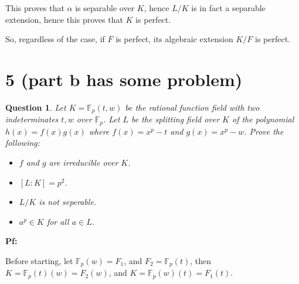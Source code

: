 \documentclass{article}
\newtheorem{question}{Question}
\begin{document}
This proves that $\alpha$ is separable over $K$, hence $L/K$ is in fact a separable extension, hence this proves that $K$ is perfect.

\hfil

So, regardless of the case, if $F$ is perfect, its algebraic extension $K/F$ is perfect.

\break

\section*{5 (part b has some problem)}
\begin{myBox}[]{}
    \begin{question}
        Let $K=\mathbb{F}_p(t,w)$ be the rational function field with two indeterminates $t,w$ over $\mathbb{F}_p$. Let $L$ be the splitting field over $K$ of the polynomial $h(x)=f(x)g(x)$ where $f(x)=x^p-t$ and $g(x)=x^p-w$. Prove the following:
        \begin{itemize}
            \item[(a)] $f$ and $g$ are irreducible over $K$.
            \item[(b)] $[L:K]=p^2$.
            \item[(c)] $L/K$ is not seperable.
            \item[(d)] $a^p\in K$ for all $a\in L$.
        \end{itemize}
    \end{question}
\end{myBox}

\textbf{Pf:}

Before starting, let $\mathbb{F}_p(w) = F_1$, and $F_2 = \mathbb{F}_p(t)$, then $K=\mathbb{F}_p(t)(w) = F_2(w)$, and $K=\mathbb{F}_p(w)(t) = F_1(t)$.
\end{document}
